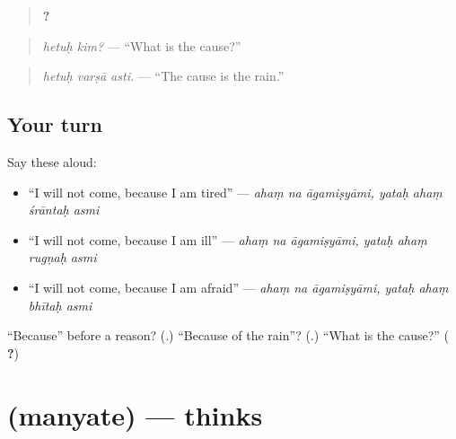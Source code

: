 \begin{quote}
\textbf{ ?}
\end{quote}

\begin{quote}
\emph{hetuḥ kim?} — \textquotedblleft{}What is the cause?\textquotedblright{}
\end{quote}

\begin{quote}
\textbf{  }
\end{quote}

\begin{quote}
\emph{hetuḥ varṣā asti.} — \textquotedblleft{}The cause is the rain.\textquotedblright{}
\end{quote}

\subsection*{Your turn}
Say these aloud:

\begin{itemize}
\raggedright
  \item \textquotedblleft{}I will not come, because I am tired\textquotedblright{} — \emph{ahaṃ na āgamiṣyāmi, yataḥ ahaṃ śrāntaḥ asmi}
  \item \textquotedblleft{}I will not come, because I am ill\textquotedblright{} — \emph{ahaṃ na āgamiṣyāmi, yataḥ ahaṃ rugṇaḥ asmi}
  \item \textquotedblleft{}I will not come, because I am afraid\textquotedblright{} — \emph{ahaṃ na āgamiṣyāmi, yataḥ ahaṃ bhītaḥ asmi}
\end{itemize}

\begin{tcolorbox}[breakable,colback=teal!4,colframe=teal!35!black,title={Before you move on}]
\textquotedblleft{}Because\textquotedblright{} before a reason? (\textbf{}.) \textquotedblleft{}Because of the rain\textquotedblright{}? (\textbf{}.) \textquotedblleft{}What is the cause?\textquotedblright{} (\textbf{ ?})
\end{tcolorbox}
\section[\texorpdfstring{\sk{मन्यते} (manyate)}{मन्यते (manyate)}]{ (manyate) — thinks}

\label{lesson:SA-C278-manyate}



